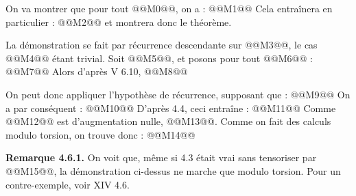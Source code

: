 
On va
montrer que pour tout @@M0@@, on a :
@@M1@@
Cela entraînera en particulier :
@@M2@@
et montrera donc le théorème.

La démonstration se fait par récurrence descendante sur @@M3@@, le cas @@M4@@ étant trivial. Soit @@M5@@, et posons pour tout @@M6@@ :
@@M7@@
Alors d'après V 6.10,
@@M8@@

On peut donc appliquer l'hypothèse de récurrence, supposant que :
@@M9@@
On a par conséquent :
@@M10@@
D'après 4.4, ceci entraîne :
@@M11@@
Comme @@M12@@ est d'augmentation nulle, @@M13@@.
Comme on fait des calculs modulo torsion, on trouve donc :
@@M14@@

\textbf{Remarque 4.6.1.} On voit que, même si 4.3 était vrai sans tensoriser par @@M15@@, la démonstration ci-dessus ne marche que modulo torsion. Pour un contre-exemple, voir XIV 4.6.

